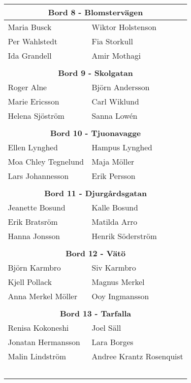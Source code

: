 \documentclass[a5paper]{article}
\begin{document}
\begin{landscape}
\begin{center}
\begin{tabular}{  l  l }
	\end{tabular}											
	\quad \hspace*{2cm}											
	\begin{tabular}{  l  l }											
		\multicolumn{2}{c}{\textbf{	Bord 8 - Blomstervägen	}} \\ \hline								
		Maria Busck	&	Wiktor Holstenson	\\								
		Per Wahlstedt	&	Fia Storkull	\\								
		Ida Grandell	&	Amir Mothagi	\\								
		&		\\ 								
		\multicolumn{2}{c}{\textbf{	Bord 9 - Skolgatan	}} \\ \hline								
		Roger Alne	&	Björn Andersson	\\								
		Marie Ericsson	&	Carl Wiklund	\\ 								
		Helena Sjöström	&	Sanna Lowén	\\ 								
		&		\\ 								
		\multicolumn{2}{c}{\textbf{	Bord 10 - Tjuonavagge	}} \\ \hline								
		Ellen Lynghed	&	Hampus Lynghed	\\								
		Moa Chley Tegnelund	&	Maja Möller	\\								
		Lars Johannesson	&	Erik Persson	\\								
		&		\\ 								
		\multicolumn{2}{c}{\textbf{	Bord 11 - Djurgårdsgatan	}} \\ \hline								
		Jeanette Bosund	&	Kalle Bosund	\\								
		Erik Bratsröm	&	Matilda Arro	\\								
		Hanna Jonsson	&	Henrik Söderström	\\								
		&		\\ 								
		\multicolumn{2}{c}{\textbf{	Bord 12 - Vätö	}} \\ \hline								
		Björn Karmbro	&	Siv Karmbro	\\								
		Kjell Pollack	&	Magnus Merkel	\\								
		Anna Merkel Möller	&	Ooy Ingmansson	\\								
		&		\\ 								
		\multicolumn{2}{c}{\textbf{	Bord 13 - Tarfalla	}} \\ \hline								
		Renisa Kokoneshi	&	Joel Säll	\\								
		Jonatan Hermansson	&	Lara Borges	\\								
		Malin Lindström	&	Andree Krantz Rosenquist	\\								
		&		\\ \\ \\ \\ \\								
	\end{tabular}											
\end{center}																				

	\end{landscape}
	\endgroup
	
	
	
\end{document}
